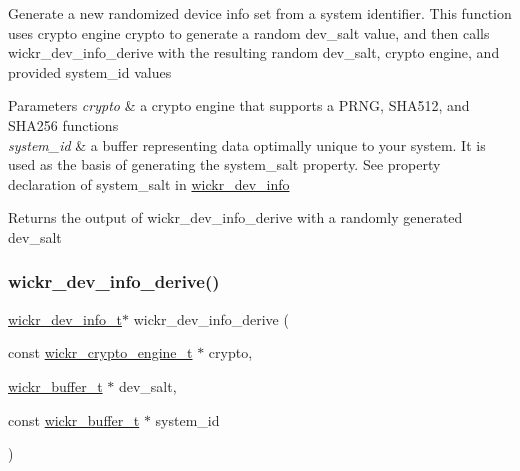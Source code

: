 Generate a new randomized device info set from a system identifier. This function uses crypto engine \textquotesingle{}crypto\textquotesingle{} to generate a random \textquotesingle{}dev\+\_\+salt\textquotesingle{} value, and then calls \textquotesingle{}wickr\+\_\+dev\+\_\+info\+\_\+derive\textquotesingle{} with the resulting random \textquotesingle{}dev\+\_\+salt\textquotesingle{}, crypto engine, and provided \textquotesingle{}system\+\_\+id\textquotesingle{} values


\begin{DoxyParams}{Parameters}
{\em crypto} & a crypto engine that supports a P\+R\+NG, S\+H\+A512, and S\+H\+A256 functions \\
\hline
{\em system\+\_\+id} & a buffer representing data optimally unique to your system. It is used as the basis of generating the \textquotesingle{}system\+\_\+salt\textquotesingle{} property. See property declaration of \textquotesingle{}system\+\_\+salt\textquotesingle{} in \textquotesingle{}\hyperlink{structwickr__dev__info}{wickr\+\_\+dev\+\_\+info}\textquotesingle{} \\
\hline
\end{DoxyParams}
\begin{DoxyReturn}{Returns}
the output of \textquotesingle{}wickr\+\_\+dev\+\_\+info\+\_\+derive\textquotesingle{} with a randomly generated \textquotesingle{}dev\+\_\+salt\textquotesingle{} 
\end{DoxyReturn}
\mbox{\label{group__wickr__dev__info_ga7f81b96fc222560762d608772b3f44bd}} 
\subsubsection{\texorpdfstring{wickr\+\_\+dev\+\_\+info\+\_\+derive()}{wickr\_dev\_info\_derive()}}
{\footnotesize\ttfamily \hyperlink{structwickr__dev__info}{wickr\+\_\+dev\+\_\+info\+\_\+t}$\ast$ wickr\+\_\+dev\+\_\+info\+\_\+derive (\begin{DoxyParamCaption}\item[{const \hyperlink{structwickr__crypto__engine}{wickr\+\_\+crypto\+\_\+engine\+\_\+t} $\ast$}]{crypto,  }\item[{\hyperlink{structwickr__buffer}{wickr\+\_\+buffer\+\_\+t} $\ast$}]{dev\+\_\+salt,  }\item[{const \hyperlink{structwickr__buffer}{wickr\+\_\+buffer\+\_\+t} $\ast$}]{system\+\_\+id }\end{DoxyParamCaption})}

